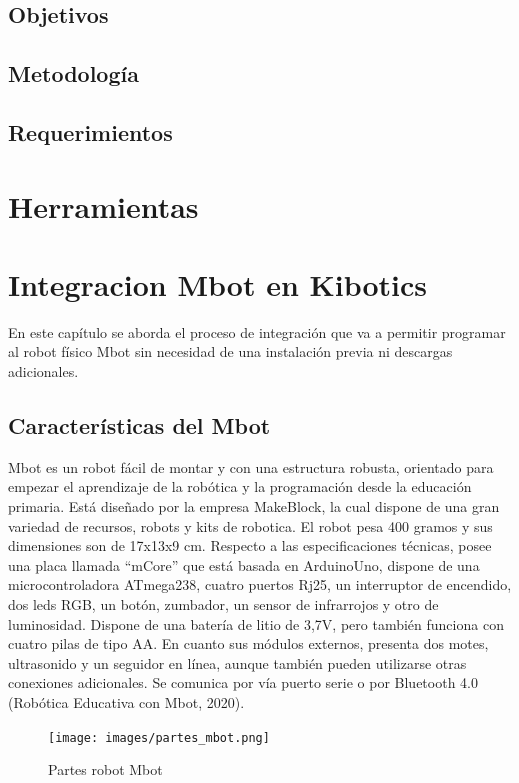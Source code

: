 \documentclass{report}
\begin{document}
\section{Objetivos}
\section{Metodología}
\section{Requerimientos}

\chapter{Herramientas}

\chapter{Integracion Mbot en Kibotics}
En este capítulo se aborda el proceso de integración que va a permitir programar al robot físico Mbot sin necesidad de una instalación previa ni descargas adicionales.

\section{Características del Mbot}

Mbot es un robot fácil de montar y con una estructura robusta, orientado para empezar el aprendizaje de la robótica y la programación desde la educación primaria. Está diseñado por la empresa MakeBlock, la cual dispone de una gran variedad de recursos, robots y kits de robotica.
El robot pesa 400 gramos y sus dimensiones son de 17x13x9 cm. Respecto a las especificaciones técnicas, posee una placa llamada “mCore” que está basada en ArduinoUno, dispone de una microcontroladora ATmega238, cuatro puertos Rj25, un interruptor de encendido, dos leds RGB, un botón, zumbador, un sensor de infrarrojos y otro de luminosidad. Dispone de una batería de litio de 3,7V, pero también funciona con cuatro pilas de tipo AA. En cuanto  sus módulos externos, presenta dos motes, ultrasonido y un seguidor en línea, aunque también pueden utilizarse otras conexiones adicionales. Se comunica por vía puerto serie o por Bluetooth 4.0 (Robótica Educativa con Mbot, 2020).
\\
\begin{figure}[h!]
  \centering
    \texttt{[image: images/partes\_mbot.png]}
  \caption{Partes robot Mbot}
  \label{figura:Partes robot Mbot}
\end{figure}
\\
\end{document}
